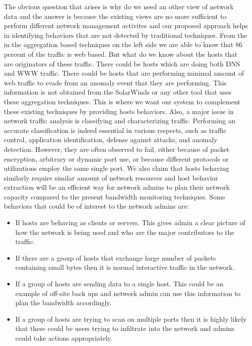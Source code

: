 The obvious question that arises is why do we need an other view of network data and the answer is because the existing views are no more sufficient to perform different network management activites and our proposed approach helps in identifying behaviors that are not detected by traditional techniques. From the  in the aggregation based techniques on the left side we are able to know that 86 percent of the traffic is web based. But what do we know about the hosts that are originators of these traffic. There could be hosts which are doing both DNS and WWW traffic. There could be hosts that are performing minimal amount of web traffic to evade from an anomaly event that they are performing. This information is not obtained from the SolarWinds or any other tool that uses these aggregation techniques. This is where we want our system to complement these existing techniques by providing hosts behaviors. Also, a major issue in network traffic analysis is classifying and characterizing traffic. Performing an accurate classification is indeed essential in various respects, such as traffic control, application identification, defense against attacks, and anomaly detection.
However, they are often observed to fail, either because of packet encryption, arbitrary or dynamic port use, or because different protocols or utilizations employ the same single port.
We also claim that hosts behaving similarly require similar amount of network resources and host behavior extraction will be an efficient way for network admins to plan their network capacity compared to the present bandwidth monitoring techniques. Some behaviors that could be of interest to the network admins are:


\begin{itemize}
	\item If hosts are behaving as clients or servers. This gives admin a clear picture of how the network is being used and who are the major contributors to the traffic.
	\item If there are a group of hosts that exchange large number of packets containing small bytes then it is normal interactive traffic in the network.	
	\item If a group of hosts are sending data to a single host. This could be an example of off-site back ups and network admin can use this information to plan the bandwidth accordingly.
	\item If a group of hosts are trying to scan on multiple ports then it is highly likely that these could be users trying to infiltrate into the network and admins could take actions appropriately.
	
\end{itemize}



